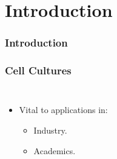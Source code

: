 \section{Introduction}


\begin{frame}{}
    \frametitle{Introduction}
\end{frame}


\begin{frame}
    \frametitle{Cell Cultures}
    \begin{columns}
            \begin{itemize}
                \item<1-> Vital to applications in:
                \begin{itemize}
                    \item<2-> Industry.
                    \item<3-> Academics.
                \end{itemize}
            \end{itemize}
            

\end{columns}
\end{frame}
